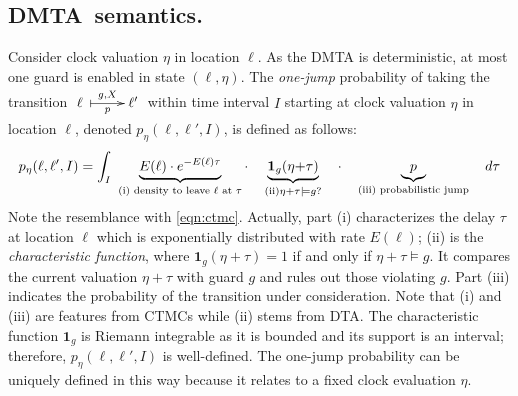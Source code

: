 \documentclass{LMCS}
\makeatletter
\newcommand{\<}{\langle}
\renewcommand{\>}{\rangle}
\newcommand{\CTMC}{\textsc{{CTMC}}}
\newcommand{\DTA}{\textsc{DTA}}
\newcommand{\DMTA}{\textsc{DMTA}}
\newcommand{\updownmapsto}[4]{\xymatrix{#1\;\ar @{|->}[r]^{#2}_{#3}&#4}}
\makeatother
\begin{document}
\subsection*{\DMTA\ semantics. }
Consider clock valuation $\eta$ in location $\ell$.
As the DMTA is deterministic, at most one guard is enabled in state $(\ell, \eta)$.
The \emph{one-jump} probability of taking the transition $\updownmapsto{\ell}{g,X}{p}{\ell'}$
within time interval $I$ starting at clock valuation $\eta$ in location $\ell$, denoted
$p_\eta(\ell,\ell',I)$, is defined as follows:
\begin{equation}
p_{\eta}(\ell,\ell',I) =
\int_I \ \underbrace{E(\ell)\cdot e^{-E(\ell)\tau}}_{\mbox{\begin{scriptsize}(i) density to leave
$\ell$ at $\tau$\end{scriptsize}}}
\cdot \quad
\underbrace{\mathbf{1}_{g}(\eta{+}\tau)}_{\textrm{(ii)}\eta{+}\tau\models g?}
\quad\cdot\quad
\underbrace{p}_{\mbox{\begin{scriptsize}(iii)
probabilistic jump\end{scriptsize}}}\quad
d\tau\label{eq:1_step_DMTA}\end{equation}
Note the resemblance with \eqref{eqn:ctmc}.
Actually, part (i) characterizes the delay $\tau$ at location $\ell$ which is exponentially
distributed with rate $E(\ell)$; (ii) is the \emph{characteristic function}, where
$\mathbf{1}_{g}(\eta{+}\tau)=1$ if and only if $\eta{+}\tau\models g$.
It compares the current valuation $\eta{+}\tau$ with guard $g$
and rules out those violating $g$.
Part (iii) indicates the probability of the transition under consideration.
Note that (i) and (iii) are features from \CTMC s while (ii) stems from \DTA.
The characteristic function $\mathbf{1}_{g}$ is Riemann integrable as it is bounded
and its support is an interval; therefore, $p_{\eta}(\ell,\ell',I)$ is well-defined.
The one-jump probability can be uniquely defined in this way because it relates to
a fixed clock evaluation $\eta$.

\bigskip
\end{document}
